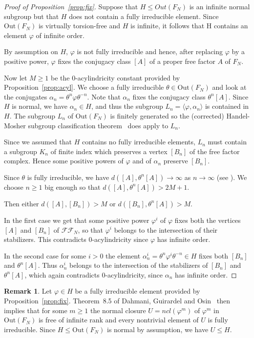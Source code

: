 \documentclass[10pt]{amsart}
\newcommand\<{\langle}
\renewcommand\>{\rangle}
\def\phi{\varphi}
\newcommand{\Out}{\mbox{Out}}
\theoremstyle{definition}
\newtheorem{rem}[thm]{Remark}
\begin{document}
\begin{proof}[Proof of  Proposition~\ref{prop:fix}]
Suppose that $H\le Out(F_N)$ is an infinite normal subgroup but that $H$ does not contain a fully irreducible element.
Since $\Out(F_N)$ is virtually torsion-free and $H$ is infinite, it  follows that H contains an element $\phi$ of infinite order.

By assumption on $H$, $\phi$ is not fully irreducible and hence, after replacing $\phi$ by a positive power, $\phi$ fixes the conjugacy class $[A]$ of a proper free factor $A$ of $F_N$.


Now let $M\ge 1$ be the 0-acylindricity constant provided by Proposition~\ref{prop:acyl}. We choose a fully irreducible $\theta\in \Out(F_N)$ and look at the conjugates $\alpha_n= \theta^n \phi\theta^{-n}$.
Note that $\alpha_n$ fixes the conjugacy class $\theta^n[A]$.  Since $H$ is normal, we have $\alpha_n\in H$, and thus the subgroup $L_n=\langle \phi, \alpha_n\rangle$ is contained in $H$.
The subgroup $L_n$ of $\Out(F_N)$ is finitely generated so the (corrected)
Handel-Mosher subgroup classification theorem~\cite{HM,HM1} does apply to $L_n$.

Since we assumed that $H$ contains no fully irreducible elements, $L_n$ must contain a subgroup $K_n$ of finite index which preserves a vertex $[B_n]$ of the free factor complex. Hence some positive powers of $\phi$ and of $\alpha_n$ preserve $[B_n]$.

Since $\theta$ is fully irreducible, we have $d([A], \theta^n[A])\to\infty$  as $n\to\infty$ (see \cite{BF08,KL2}). We choose $n\ge 1$ big enough so that $d([A], \theta^n[A]) > 2M+1$.

Then either $d([A], [B_n])>M$ or $d([B_n], \theta^n[A])>M$.


In the first case we get that some positive power $\phi^i$ of $\phi$ fixes both the vertices $[A]$ and $[B_n]$ of $\mathcal{FF}_N$, so that $\phi^i$ belongs to the intersection of their stabilizers. This contradicts 0-acylindricity since $\phi$ has infinite order.


In the second case for some $i>0$ the element $\alpha_n^i=\theta^n\phi^i\theta^{-n}\in H$ fixes both $[B_n]$ and $\theta^n[A]$. Thus $\alpha_n^i$ belongs to the intersection of the stabilizers of $[B_n]$ and $\theta^n[A]$, which again contradicts 0-acylindricity, since $\alpha_n$ has infinite order.
\end{proof}

\begin{rem}
Let $\phi\in H$ be a fully irreducible element provided by
Proposition~\ref{prop:fix}. Theorem~8.5 of Dahmani, Guirardel and
Osin~\cite{DGO} then implies that for some $m\ge 1$ the normal closure
$U=ncl(\phi^m)$ of $\phi^m$ in $\Out(F_N)$ is free of infinite rank
and every nontrivial element of $U$ is fully irreducible. Since $H\le
\Out(F_N)$ is normal by assumption, we have $U\le H$.
\end{rem}
\end{document}
